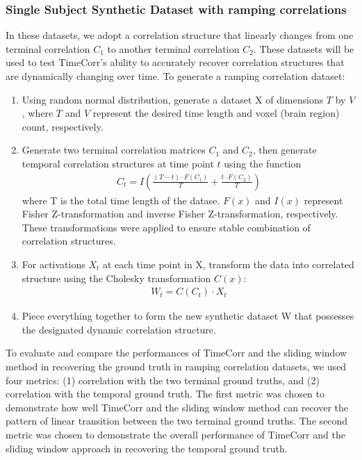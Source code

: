 \documentclass[11pt]{article}
\begin{document}
\begin{enumerate}
\subsubsection{Single Subject Synthetic Dataset with ramping correlations}

In these datasets, we adopt a correlation structure that linearly changes from one terminal correlation $C_1$ to another terminal correlation $C_2$. These datasets will be used to test TimeCorr's ability to accurately recover correlation structures that are dynamically changing over time. To generate a ramping correlation dataset:
\begin{enumerate}
\item Using random normal distribution, generate a dataset X of dimensions $T$ by $V$, where $T$ and $V$ represent the desired time length and voxel (brain region) count, respectively.
\item Generate two terminal correlation matrices $C_1$ and $C_2$, then generate temporal correlation structures at time point $t$ using the function
\begin{align*}
C_t = I\left(\frac{(T-t) \cdot F(C_1)}{T} + \frac{t\cdot F(C_2)}{T}\right)
\end{align*}
where T is the total time length of the datase. $F(x)$ and $I(x)$ represent Fisher Z-transformation and inverse Fisher Z-transformation, respectively. These transformations were applied to ensure stable combination of correlation structures.
\item For activations $X_t$ at each time point in X, transform the data into correlated structure using the Cholesky transformation $C(x)$:
\begin{align*}
W_t = C(C_t) \cdot X_t
\end{align*}
\item Piece everything together to form the new synthetic dataset W that possesses the designated dynamic correlation structure.
\end{enumerate}

To evaluate and compare the performances of TimeCorr and the sliding window method in recovering the ground truth in ramping correlation datasets, we used four metrics: (1) correlation with the two terminal ground truths, and (2) correlation with the temporal ground truth. The first metric was chosen to demonstrate how well TimeCorr and the sliding window method can recover the pattern of linear transition between the two terminal ground truths. The second metric was chosen to demonstrate the overall performance of TimeCorr and the sliding window approach in recovering the temporal ground truth.


\end{enumerate}
\end{document}
